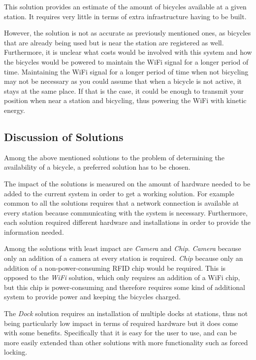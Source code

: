 This solution provides an estimate of the amount of bicycles available at a given station.
It requires very little in terms of extra infrastructure having to be built.

However, the solution is not as accurate as previously mentioned ones, as bicycles that are already being used but is near the station are registered as well.
Furthermore, it is unclear what costs would be involved with this system and how the bicycles would be powered to maintain the WiFi signal for a longer period of time. 
Maintaining the WiFi signal for a longer period of time when not bicycling may not be necessary as you could assume that when a bicycle is not active, it stays at the same place.
If that is the case, it could be enough to transmit your position when near a station and bicycling, thus powering the WiFi with kinetic energy.

\subsection{Discussion of Solutions}
Among the above mentioned solutions to the problem of determining the availability of a bicycle, a preferred solution has to be chosen. 

The impact of the solutions is measured on the amount of hardware needed to be added to the current system in order to get a working solution. 
For example common to all the solutions requires that a network connection is available at every station because communicating with the system is necessary. 
Furthermore, each solution required different hardware and installations in order to provide the information needed. 

Among the solutions with least impact are \textit{Camera} and \textit{Chip}. 
\textit{Camera} because only an addition of a camera at every station is required. 
\textit{Chip} because only an addition of a non-power-consuming RFID chip would be required.
This is opposed to the \textit{WiFi} solution, which only requires an addition of a WiFi chip, but this chip is power-consuming and therefore requires some kind of additional system to provide power and keeping the bicycles charged.

The \textit{Dock} solution requires an installation of multiple docks at stations, thus not being particularly low impact in terms of required hardware but it does come with some benefits.
Specifically that it is easy for the user to use, and can be more easily extended than other solutions with more functionality such as forced locking.


